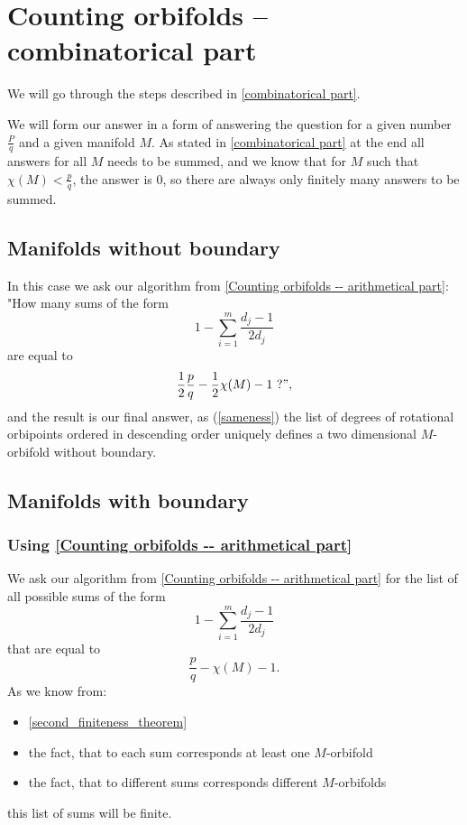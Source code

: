 \chapter{Counting orbifolds -- combinatorical part}\label{Counting orbifolds -- combinatorical part}
We will go through the steps described in \ref{combinatorical part}.

We will form our answer in a form of answering the 
question for a given number $\frac{P}{q}$ and a given manifold $M$. 
As stated in \ref{combinatorical part} at the end all answers for all $M$ needs to be summed, 
and we know that for $M$ such that $\chi(M) < \frac{p}{q}$, the answer is $0$, so there 
are always only finitely many answers to be summed. 

\section{Manifolds without boundary}
In this case we ask our algorithm from \ref{Counting orbifolds -- arithmetical part}: 
"How many sums of the form
\begin{equation}
1-\sum_{i=1}^m \frac{d_j-1}{2d_j} 
\end{equation}
are equal to 
\begin{equation}
\frac{1}{2}\frac{p}{q} - \frac{1}{2}\chi(M) -1\ ?",
\end{equation}
and the result is our final answer, as (\ref{sameness}) the list of degrees of rotational orbipoints ordered 
in descending order uniquely defines a two dimensional $M$-orbifold without boundary. 
\section{Manifolds with boundary}
\subsection{Using \ref{Counting orbifolds -- arithmetical part}}\label{use algorithm step}
We ask our algorithm from \ref{Counting orbifolds -- arithmetical part} for the list 
of all possible sums of the form
\begin{equation}
1-\sum_{i=1}^m \frac{d_j-1}{2d_j} 
\end{equation}
that are equal to 
\begin{equation}
\frac{p}{q} - \chi(M) - 1. 
\end{equation}
As we know from: 
\begin{itemize}
\item \ref{second_finiteness_theorem} 
\item the fact, that to each 
sum corresponds at least one $M$-orbifold
\item the fact, that to different sums corresponds different $M$-orbifolds
\end{itemize}
this list of sums will be finite. 
